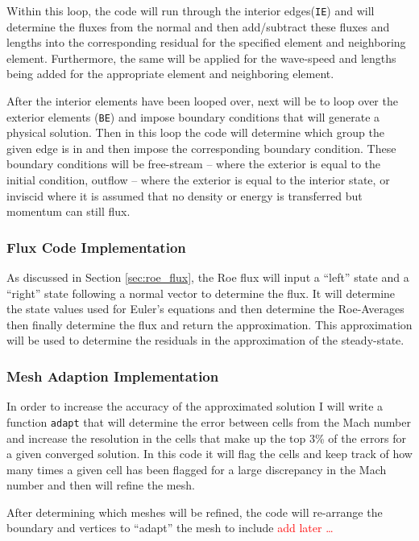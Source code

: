 Within this loop, the code will run through the interior edges({\texttt{IE}}) and will determine the fluxes from the normal and then add/subtract these fluxes and lengths into the corresponding residual for the specified element and neighboring element. Furthermore, the same will be applied for the wave-speed and lengths being added for the appropriate element and neighboring element.

After the interior elements have been looped over, next will be to loop over the exterior elements ({\texttt{BE}}) and impose boundary conditions that will generate a physical solution. Then in this loop the code will determine which group the given edge is in and then impose the corresponding boundary condition. These boundary conditions will be free-stream -- where the exterior is equal to the initial condition, outflow -- where the exterior is equal to the interior state, or inviscid where it is assumed that no density or energy is transferred but momentum can still flux.

\pagebreak
\subsubsection{Flux Code Implementation}
As discussed in Section \ref{sec:roe_flux}, the Roe flux will input a ``left'' state and a ``right'' state following a normal vector to determine the flux. It will determine the state values used for Euler's equations and then determine the Roe-Averages then finally determine the flux and return the approximation. This approximation will be used to determine the residuals in the approximation of the steady-state.


\subsubsection{Mesh Adaption Implementation}
In order to increase the accuracy of the approximated solution I will write a function {\texttt{adapt}} that will determine the error between cells from the Mach number and increase the resolution in the cells that make up the top 3\% of the errors for a given converged solution. In this code it will flag the cells and keep track of how many times a given cell has been flagged for a large discrepancy in the Mach number and then will refine the mesh.

After determining which meshes will be refined, the code will re-arrange the boundary and vertices to ``adapt'' the mesh to include \textcolor{red}{add later \ldots}


